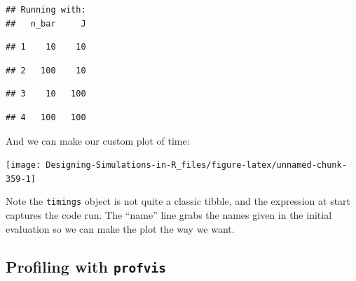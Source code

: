\documentclass[
]{book}
\newenvironment{Shaded}{\begin{snugshade}}{\end{snugshade}}
\newcommand{\AttributeTok}[1]{\textcolor[rgb]{0.13,0.29,0.53}{#1}}
\newcommand{\FunctionTok}[1]{\textcolor[rgb]{0.13,0.29,0.53}{\textbf{#1}}}
\newcommand{\NormalTok}[1]{#1}
\newcommand{\OtherTok}[1]{\textcolor[rgb]{0.56,0.35,0.01}{#1}}
\newcommand{\SpecialCharTok}[1]{\textcolor[rgb]{0.81,0.36,0.00}{\textbf{#1}}}
\newcommand{\StringTok}[1]{\textcolor[rgb]{0.31,0.60,0.02}{#1}}
\begin{document}
\begin{verbatim}
## Running with:
##   n_bar     J
\end{verbatim}

\begin{verbatim}
## 1    10    10
\end{verbatim}

\begin{verbatim}
## 2   100    10
\end{verbatim}

\begin{verbatim}
## 3    10   100
\end{verbatim}

\begin{verbatim}
## 4   100   100
\end{verbatim}

And we can make our custom plot of time:

\begin{Shaded}
\end{Shaded}

\begin{center}\texttt{[image: Designing-Simulations-in-R\_files/figure-latex/unnamed-chunk-359-1]} \end{center}

Note the \texttt{timings} object is not quite a classic tibble, and the expression at start captures the code run. The ``name'' line grabs the names given in the initial evaluation so we can make the plot the way we want.

\subsection{\texorpdfstring{Profiling with \texttt{profvis}}{Profiling with profvis}}\label{profiling-with-profvis}
\end{document}
